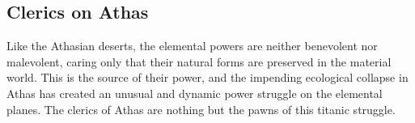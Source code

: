 
















\subsection{Clerics on Athas}

Like the Athasian deserts, the elemental powers are neither benevolent nor malevolent, caring only that their natural forms are preserved in the material world. This is the source of their power, and the impending ecological collapse in Athas has created an unusual and dynamic power struggle on the elemental planes. The clerics of Athas are nothing but the pawns of this titanic struggle.

